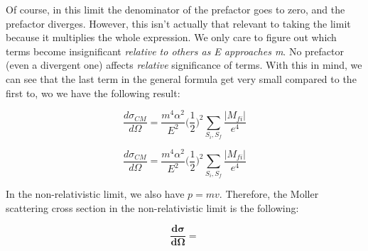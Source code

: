 \documentclass[a4]{article}
\begin{document}
    Of course, in this limit the denominator of the prefactor goes to zero, and the prefactor diverges. However, this isn't actually that relevant to taking the limit because it multiplies the whole expression. We only care to figure out which
    terms become insignificant \textit{relative to others as E approaches m}. No prefactor (even a divergent one) affects \textit{relative} significance of terms. With this in mind, we can see that the last term in the general formula get very
    small compared to the first to, wo we have the following result:

    \begin{equation}
        \frac{d \sigma_{CM}}{d \Omega} = \frac{m^4 \alpha^2}{E^2} \bigg( \frac{1}{2} \bigg)^2 \sum_{S_i, S_f} \frac{|M_{fi}|}{e^4}
    \end{equation}

    \begin{equation}
        \frac{d \sigma_{CM}}{d \Omega} = \frac{m^4 \alpha^2}{E^2} \bigg( \frac{1}{2} \bigg)^2 \sum_{S_i, S_f} \frac{|M_{fi}|}{e^4}
    \end{equation}

    In the non-relativistic limit, we also have $p = mv$. Therefore, the Moller scattering cross section in the non-relativistic limit is the following:

    \begin{framed}
        \begin{equation}
            \mathbf{\frac{d \sigma}{d \Omega} = }
        \end{equation}
    \end{framed}
\end{document}

